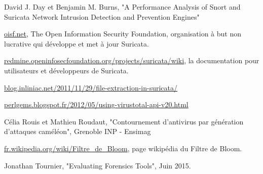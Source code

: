 \documentclass{svjour3}
\begin{document}
\begin{thebibliography}{}
%

David J. Day et Benjamin M. Burns, "A Performance Analysis of Snort and Suricata Network Intrusion Detection and Prevention Engines"

\url{oisf.net}, The Open Information Security Foundation, organisation à but non lucrative qui développe et met à jour Suricata.

\url{redmine.openinfosecfoundation.org/projects/suricata/wiki}, la documentation pour utilisateurs et développeurs de Suricata.

\url{blog.inliniac.net/2011/11/29/file-extraction-in-suricata/}

\url{perlgems.blogspot.fr/2012/05/using-virustotal-api-v20.html}

Célia Rouis et Mathieu Roudaut, "Contournement d'antivirus par génération d'attaques caméléon", Grenoble INP - Ensimag

\url{fr.wikipedia.org/wiki/Filtre_de_Bloom}, page wikipédia du Filtre de Bloom.

Jonathan Tournier, "Evaluating Forensics Tools", Juin 2015.


\end{thebibliography}
\end{document}
